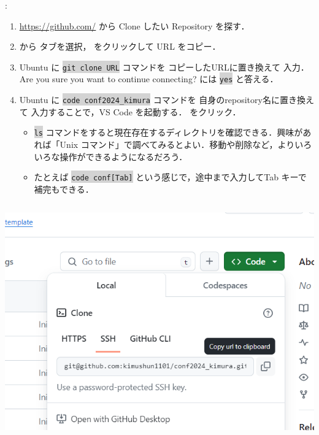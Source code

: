 \documentclass[aspectratio=169,dvipdfmx,cjk]{beamer}
\newcommand{\cmdline}[1]{
    \colorbox{lightgray}{\lstinline[style=command]{#1}}
}
\newcommand{\blue}[1]{ {\color{blue} #1} }
\begin{document}
\begin{frame}{\insertsection \thesubsection: \insertsubsection }
  \begin{enumerate}
    \item \href{https://github.com/}{https://github.com/} から Clone したい Repository を探す．
    \item {} から  タブを選択， をクリックして URL をコピー．
    \item Ubuntu に \cmdline{git clone URL} コマンドを\blue{コピーしたURLに置き換えて}入力．\\
    Are you sure you want to continue connecting? には \cmdline{yes} と答える．
    \item Ubuntu に \cmdline{code conf2024_kimura} コマンドを\blue{自身のrepository名に置き換えて}入力することで，VS Code を起動する． をクリック．
    \begin{itemize}
      \item \cmdline{ls} コマンドをすると現在存在するディレクトリを確認できる．興味があれば「Unix コマンド」で調べてみるとよい．移動や削除など，よりいろいろな操作ができるようになるだろう．
      \item たとえば \cmdline{code conf[Tab]} という感じで，途中まで入力してTab キーで補完もできる．
    \end{itemize}
  \end{enumerate}
  \begin{columns}
    \begin{column}{0.25\textwidth}
        \includegraphics[width=1.0\linewidth]{fig/clone-url.png}
    \end{column}

\end{columns}
\end{frame}
\end{document}
